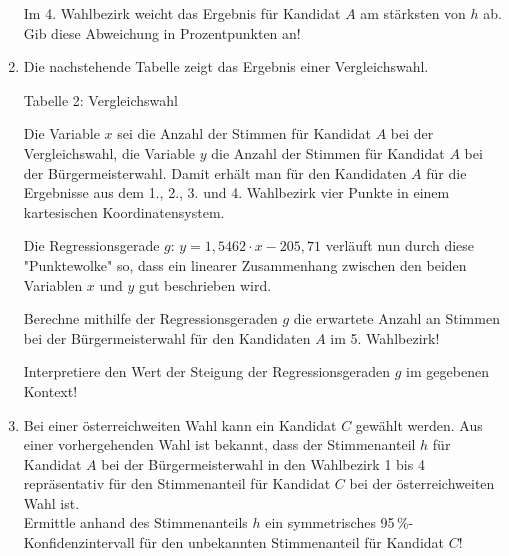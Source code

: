 \begin{langesbeispiel}
\begin{enumerate}
	Im 4. Wahlbezirk weicht das Ergebnis für Kandidat $A$ am stärksten von $h$ ab.\\
	Gib diese Abweichung in Prozentpunkten an!
	
	\item Die nachstehende Tabelle zeigt das Ergebnis einer Vergleichswahl.
	
	Tabelle 2: Vergleichswahl
	

Die Variable $x$ sei die Anzahl der Stimmen für Kandidat $A$ bei der Vergleichswahl, die Variable $y$ die Anzahl der Stimmen für Kandidat $A$ bei der Bürgermeisterwahl. Damit erhält man für den Kandidaten $A$ für die Ergebnisse aus dem 1., 2., 3. und 4. Wahlbezirk vier Punkte in einem kartesischen Koordinatensystem.

Die Regressionsgerade $g$: $y=1,5462\cdot x-205,71$ verläuft nun durch diese "Punktewolke" so, dass ein linearer Zusammenhang zwischen den beiden Variablen $x$ und $y$ gut beschrieben wird.

Berechne mithilfe der Regressionsgeraden $g$ die erwartete Anzahl an Stimmen bei der Bürgermeisterwahl für den Kandidaten $A$ im 5. Wahlbezirk!

Interpretiere den Wert der Steigung der Regressionsgeraden $g$ im gegebenen Kontext!

\item Bei einer österreichweiten Wahl kann ein Kandidat $C$ gewählt werden. Aus einer vorhergehenden Wahl ist bekannt, dass der Stimmenanteil $h$ für Kandidat $A$ bei der Bürgermeisterwahl in den Wahlbezirk 1 bis 4 repräsentativ für den Stimmenanteil für Kandidat $C$ bei der österreichweiten Wahl ist.\\
Ermittle anhand des Stimmenanteils $h$ ein symmetrisches 95\,\%-Konfidenzintervall für den unbekannten Stimmenanteil für Kandidat $C$!


\end{enumerate}
\end{langesbeispiel}
